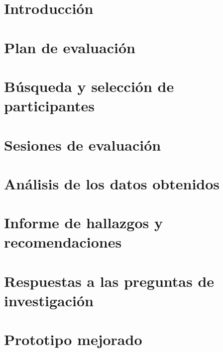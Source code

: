 
\section{Introducción}

\section{Plan de evaluación}

\section{Búsqueda y selección de participantes}

\section{Sesiones de evaluación}

\section{Análisis de los datos obtenidos}

\section{Informe de hallazgos y recomendaciones}

\section{Respuestas a las preguntas de investigación}

\section{Prototipo mejorado}